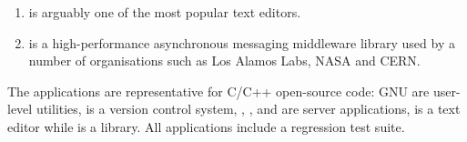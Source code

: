 \begin{enumerate}
\item[\vim\footnote{\url{http://www.vim.org/}}] is arguably one of the most
popular text editors.

\item[\zeromq\footnote{\url{http://zeromq.org/}}]
is a high-performance asynchronous messaging middleware library used by a
number of organisations such as Los Alamos Labs, NASA and CERN.


\end{enumerate}

The \numSystems applications are representative for C/C++ open-source code: GNU
\binutils are user-level utilities, \git is a version control system,
\beanstalkd, \lighttpdtwo, \memcached and \redis are server applications, \vim
is a text editor while \zeromq is a library.  All applications include a
regression test suite.

